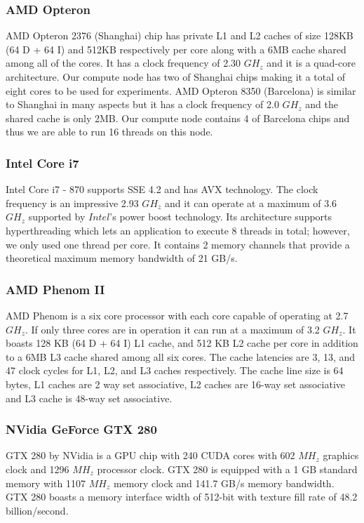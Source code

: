 \documentclass{IEEEtran}
\begin{document}
\subsubsection{AMD Opteron}
\label{ss:opteron} AMD Opteron 2376 (Shanghai) chip has private L1 and L2 caches of size 128KB (64 D + 64 I) and 512KB respectively per core along with a 6MB cache shared among all of the cores. It has a clock frequency of 2.30 $GH_z$ and it is a quad-core architecture. Our compute node has two of Shanghai chips making it a total of eight cores to be used for experiments. AMD Opteron 8350 (Barcelona) is similar to Shanghai in many aspects but it has a clock frequency of 2.0 $GH_z$ and the shared cache is only 2MB. Our compute node contains 4 of Barcelona chips and thus we are able to run 16 threads on this node. 

\subsubsection{Intel Core i7}

\label{ss:corei7}Intel Core i7 - 870 supports SSE 4.2 and has AVX technology. The clock frequency is an impressive 2.93 $GH_z$ and it can operate at a maximum of 3.6 $GH_z$ supported by $Intel$'s power boost technology. Its architecture supports hyperthreading which lets an application to execute 8 threads in total; however, we only used one thread per core. It contains 2 memory channels that provide a theoretical maximum memory bandwidth of 21 GB/s. 

\subsubsection{AMD Phenom II}
\label{ss:phenom} AMD Phenom is a six core processor with each core capable of operating at 2.7 $GH_z$. If only three cores are in operation it can run at a maximum of 3.2 $GH_z$. It boasts 128 KB (64 D + 64 I) L1 cache, and 512 KB L2 cache per core in addition to a 6MB L3 cache shared among all six cores. The cache latencies are 3, 13, and 47 clock cycles for L1, L2, and L3 caches respectively. The cache line size is 64 bytes, L1 caches are 2 way set associative, L2 caches are 16-way set associative and L3 cache is 48-way set associative. 

\subsubsection{NVidia GeForce GTX 280}

GTX 280 by NVidia is a GPU chip with 240 CUDA cores with 602 $MH_z$ graphics clock and 1296 $MH_z$ processor clock. GTX 280 is equipped with a 1 GB standard memory with 1107 $MH_z$ memory clock and 141.7 GB/s memory bandwidth. GTX 280 boasts a memory interface width of 512-bit with texture fill rate of 48.2 billion/second. 
\end{document}
